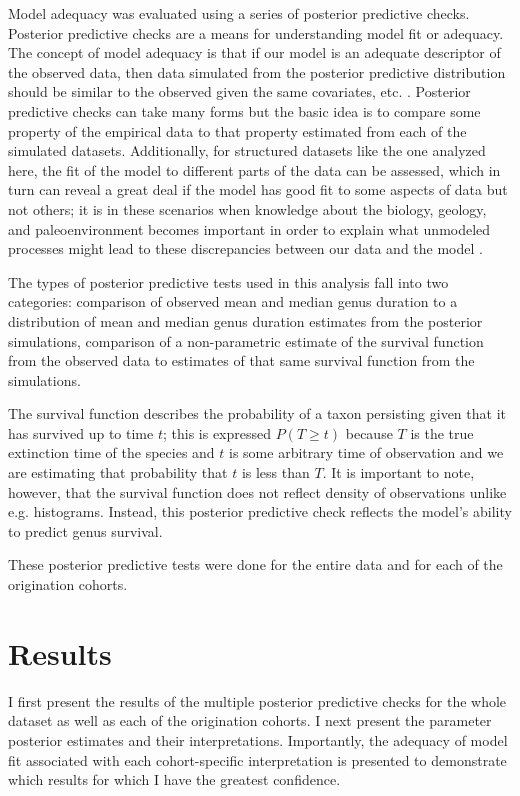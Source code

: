 \documentclass[11pt]{article}
\begin{document}
Model adequacy was evaluated using a series of posterior predictive checks. Posterior predictive checks are a means for understanding model fit or adequacy. The concept of model adequacy is that if our model is an adequate descriptor of the observed data, then data simulated from the posterior predictive distribution should be similar to the observed given the same covariates, etc. \citep{Gelman2013d}. Posterior predictive checks can take many forms but the basic idea is to compare some property of the empirical data to that property estimated from each of the simulated datasets. Additionally, for structured datasets like the one analyzed here, the fit of the model to different parts of the data can be assessed, which in turn can reveal a great deal if the model has good fit to some aspects of data but not others; it is in these scenarios when knowledge about the biology, geology, and paleoenvironment becomes important in order to explain what unmodeled processes might lead to these discrepancies between our data and the model \citep{Gelman2013d}.

The types of posterior predictive tests used in this analysis fall into two categories: comparison of observed mean and median genus duration to a distribution of mean and median genus duration estimates from the posterior simulations, comparison of a non-parametric estimate of the survival function from the observed data to estimates of that same survival function from the simulations. 

The survival function describes the probability of a taxon persisting given that it has survived up to time \(t\); this is expressed \(P(T \geq t)\) because \(T\) is the true extinction time of the species and \(t\) is some arbitrary time of observation and we are estimating that probability that \(t\) is less than \(T\). It is important to note, however, that the survival function does not reflect density of observations unlike e.g. histograms. Instead, this posterior predictive check reflects the model's ability to predict genus survival.

These posterior predictive tests were done for the entire data and for each of the origination cohorts.







\section*{Results}
I first present the results of the multiple posterior predictive checks for the whole dataset as well as each of the origination cohorts. I next present the parameter posterior estimates and their interpretations. Importantly, the adequacy of model fit associated with each cohort-specific interpretation is presented to demonstrate which results for which I have the greatest confidence.
\end{document}
